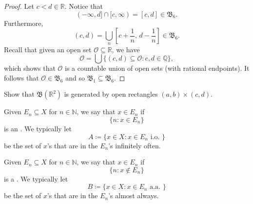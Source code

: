 \documentclass[notoc,notitlepage]{tufte-book}
\begin{document}
\begin{proof}
  \noindent
  Let $c < d \in \mathbb{R}$.
  Notice that
  \begin{equation*}
    (-\infty, d] \cap [c, \infty) = [c, d] \in \mathfrak{B}_6.
  \end{equation*}
  Furthermore,
  \begin{equation*}
    (c, d) = \bigcup_{n} \left[ c + \frac{1}{n},\, d - \frac{1}{n} \right]
      \in \mathfrak{B}_6.
  \end{equation*}
  Recall that given an open set $\mathcal{O} \subseteq \mathbb{R}$,
  we have
  \begin{equation*}
    \mathcal{O} = \bigcup \{ (c, d) \subseteq \mathcal{O} : c, d \in \mathbb{Q} \},
  \end{equation*}
  which shows that $\mathcal{O}$ is a countable union of open sets
  (with rational endpoints).
  It follows that $\mathcal{O} \in \mathfrak{B}_6$ and so
  $\mathfrak{B}_1 \subseteq \mathfrak{B}_6$.
\end{proof}

\begin{ex}
  Show that $\mathfrak{B}(\mathbb{R}^2)$ is generated by
  open rectangles $(a, b) \times (c, d)$.
\end{ex}

\begin{defn}\label{defn:infinitely_often}
  Given $E_n \subseteq X$ for $n \in \mathbb{N}$,
  we say that $x \in E_n$  if
  \begin{equation*}
    \{ n : x \in E_n \}
  \end{equation*}
  is an .
  We typically let
  \begin{equation*}
    A \coloneqq \{ x \in X : x \in E_n \text{ i.o. } \}
  \end{equation*}
  be the set of $x$'s that are in the $E_n$'s infinitely often.
\end{defn}

\begin{defn}\label{defn:almost_always}
  Given $E_n \subseteq X$ for $n \in \mathbb{N}$,
  we say that $x \in E_n$  if
  \begin{equation*}
    \{ n : x \notin E_n \}
  \end{equation*}
  is a .
  We typically let
  \begin{equation*}
    B \coloneqq \{ x \in X : x \in E_n \text{ a.a. } \}
  \end{equation*}
  be the set of $x$'s that are in the $E_n$'s almost always.
\end{defn}
\end{document}
